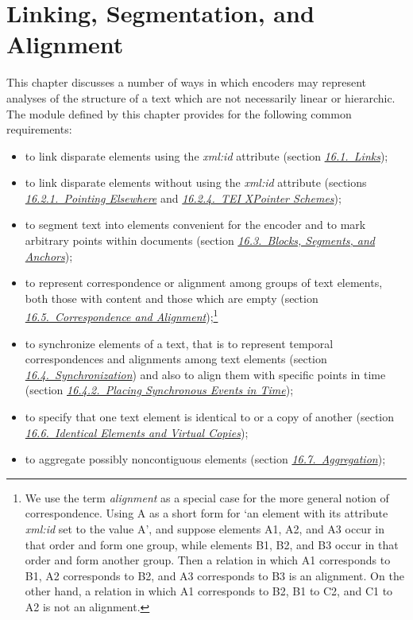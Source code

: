 
\section[{Linking, Segmentation, and Alignment}]{Linking, Segmentation, and Alignment}\label{SA}\par
This chapter discusses a number of ways in which encoders may represent analyses of the structure of a text which are not necessarily linear or hierarchic. The module defined by this chapter provides for the following common requirements: \begin{itemize}
\item to link disparate elements using the {\itshape xml:id} attribute (section \textit{\hyperref[SAPT]{16.1.\ Links}});
\item to link disparate elements without using the {\itshape xml:id} attribute (sections \textit{\hyperref[SAUR]{16.2.1.\ Pointing Elsewhere}} and \textit{\hyperref[SATS]{16.2.4.\ TEI XPointer Schemes}});
\item to segment text into elements convenient for the encoder and to mark arbitrary points within documents (section \textit{\hyperref[SASE]{16.3.\ Blocks, Segments, and Anchors}});
\item to represent correspondence or alignment among groups of text elements, both those with content and those which are empty (section \textit{\hyperref[SACS]{16.5.\ Correspondence and Alignment}});\footnote{We use the term \textit{alignment} as a special case for the more general notion of correspondence. Using A as a short form for ‘an element with its attribute {\itshape xml:id} set to the value A’, and suppose elements A1, A2, and A3 occur in that order and form one group, while elements B1, B2, and B3 occur in that order and form another group. Then a relation in which A1 corresponds to B1, A2 corresponds to B2, and A3 corresponds to B3 is an alignment. On the other hand, a relation in which A1 corresponds to B2, B1 to C2, and C1 to A2 is not an alignment.}
\item to synchronize elements of a text, that is to represent temporal correspondences and alignments among text elements (section \textit{\hyperref[SASY]{16.4.\ Synchronization}}) and also to align them with specific points in time (section \textit{\hyperref[SASYMP]{16.4.2.\ Placing Synchronous Events in Time}});
\item to specify that one text element is identical to or a copy of another (section \textit{\hyperref[SAIE]{16.6.\ Identical Elements and Virtual Copies}});
\item to aggregate possibly noncontiguous elements (section \textit{\hyperref[SAAG]{16.7.\ Aggregation}});

\end{itemize}
